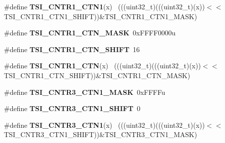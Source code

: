 \begin{DoxyCompactItemize}
\item 
\hypertarget{group___t_s_i___register___masks_ga2a691594a820a057852e27a1576af469}{}\#define {\bfseries T\+S\+I\+\_\+\+C\+N\+T\+R1\+\_\+\+C\+T\+N1}(x)                                            ~(((uint32\+\_\+t)(((uint32\+\_\+t)(x))$<$$<$T\+S\+I\+\_\+\+C\+N\+T\+R1\+\_\+\+C\+T\+N1\+\_\+\+S\+H\+I\+F\+T))\&T\+S\+I\+\_\+\+C\+N\+T\+R1\+\_\+\+C\+T\+N1\+\_\+\+M\+A\+S\+K)\label{group___t_s_i___register___masks_ga2a691594a820a057852e27a1576af469}

\item 
\hypertarget{group___t_s_i___register___masks_ga5c1efa805b567ae0b51c7b93c396afd5}{}\#define {\bfseries T\+S\+I\+\_\+\+C\+N\+T\+R1\+\_\+\+C\+T\+N\+\_\+\+M\+A\+S\+K}~0x\+F\+F\+F\+F0000u\label{group___t_s_i___register___masks_ga5c1efa805b567ae0b51c7b93c396afd5}

\item 
\hypertarget{group___t_s_i___register___masks_gafaa522509f837ff019a51e3c70e44261}{}\#define {\bfseries T\+S\+I\+\_\+\+C\+N\+T\+R1\+\_\+\+C\+T\+N\+\_\+\+S\+H\+I\+F\+T}~16\label{group___t_s_i___register___masks_gafaa522509f837ff019a51e3c70e44261}

\item 
\hypertarget{group___t_s_i___register___masks_ga7136c31bbd395dd222bff4c650e768dc}{}\#define {\bfseries T\+S\+I\+\_\+\+C\+N\+T\+R1\+\_\+\+C\+T\+N}(x)                                              ~(((uint32\+\_\+t)(((uint32\+\_\+t)(x))$<$$<$T\+S\+I\+\_\+\+C\+N\+T\+R1\+\_\+\+C\+T\+N\+\_\+\+S\+H\+I\+F\+T))\&T\+S\+I\+\_\+\+C\+N\+T\+R1\+\_\+\+C\+T\+N\+\_\+\+M\+A\+S\+K)\label{group___t_s_i___register___masks_ga7136c31bbd395dd222bff4c650e768dc}

\item 
\hypertarget{group___t_s_i___register___masks_ga944c52b8a9c3019342c1c27eb7ab5d1f}{}\#define {\bfseries T\+S\+I\+\_\+\+C\+N\+T\+R3\+\_\+\+C\+T\+N1\+\_\+\+M\+A\+S\+K}~0x\+F\+F\+F\+Fu\label{group___t_s_i___register___masks_ga944c52b8a9c3019342c1c27eb7ab5d1f}

\item 
\hypertarget{group___t_s_i___register___masks_ga40857a8de39e7f24268f2209546b7d92}{}\#define {\bfseries T\+S\+I\+\_\+\+C\+N\+T\+R3\+\_\+\+C\+T\+N1\+\_\+\+S\+H\+I\+F\+T}~0\label{group___t_s_i___register___masks_ga40857a8de39e7f24268f2209546b7d92}

\item 
\hypertarget{group___t_s_i___register___masks_ga1e6f0a4e5556aaf6a47e0c4b09abcdf8}{}\#define {\bfseries T\+S\+I\+\_\+\+C\+N\+T\+R3\+\_\+\+C\+T\+N1}(x)                                            ~(((uint32\+\_\+t)(((uint32\+\_\+t)(x))$<$$<$T\+S\+I\+\_\+\+C\+N\+T\+R3\+\_\+\+C\+T\+N1\+\_\+\+S\+H\+I\+F\+T))\&T\+S\+I\+\_\+\+C\+N\+T\+R3\+\_\+\+C\+T\+N1\+\_\+\+M\+A\+S\+K)\label{group___t_s_i___register___masks_ga1e6f0a4e5556aaf6a47e0c4b09abcdf8}


\end{DoxyCompactItemize}
